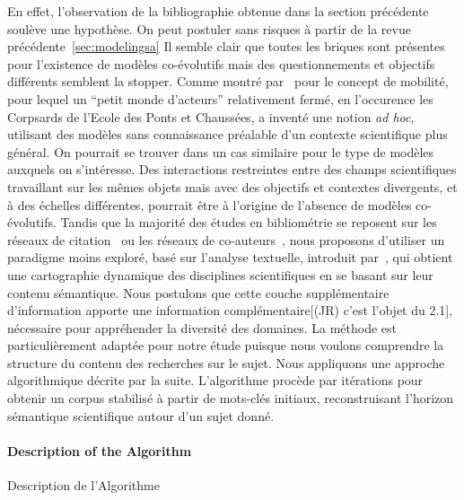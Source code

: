 {En effet, l'observation de la bibliographie obtenue dans la section précédente soulève une hypothèse. On peut postuler sans risques à partir de la revue précédente~\ref{sec:modelingsa} Il semble clair que toutes les briques sont présentes pour l'existence de modèles co-évolutifs mais des questionnements et objectifs différents semblent la stopper. Comme montré par~\cite{commenges:tel-00923682} pour le concept de mobilité, pour lequel un ``petit monde d'acteurs'' relativement fermé, en l'occurence les Corpsards de l'Ecole des Ponts et Chaussées, a inventé une notion \emph{ad hoc}, utilisant des modèles sans connaissance préalable d'un contexte scientifique plus général. On pourrait se trouver dans un cas similaire pour le type de modèles auxquels on s'intéresse. Des interactions restreintes entre des champs scientifiques travaillant sur les mêmes objets mais avec des objectifs et contextes divergents, et à des échelles différentes, pourrait être à l'origine de l'absence de modèles co-évolutifs. Tandis que la majorité des études en bibliométrie se reposent sur les réseaux de citation~\cite{2013arXiv1310.8220N} ou les réseaux de co-auteurs~\cite{2014arXiv1402.7268S}, nous proposons d'utiliser un paradigme moins exploré, basé sur l'analyse textuelle, introduit par~\cite{chavalarias2013phylomemetic}, qui obtient une cartographie dynamique des disciplines scientifiques en se basant sur leur contenu sémantique. Nous postulons que cette couche supplémentaire d'information apporte une information complémentaire[(JR) c'est l'objet du 2.1], nécessaire pour appréhender la diversité des domaines. La méthode est particulièrement adaptée pour notre étude puisque nous voulons comprendre la structure du contenu des recherches sur le sujet. Nous appliquons une approche algorithmique décrite par la suite. L'algorithme procède par itérations pour obtenir un corpus stabilisé à partir de mots-clés initiaux, reconstruisant l'horizon sémantique scientifique autour d'un sujet donné.
}


\paragraph{Description of the Algorithm}{Description de l'Algorithme}


